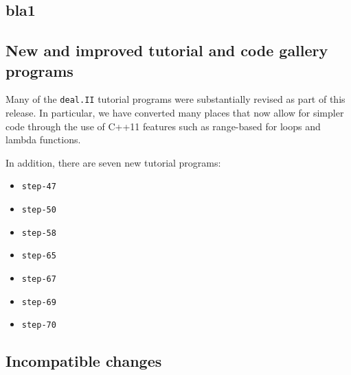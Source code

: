 \documentclass{ansarticle-preprint}
\newcommand{\specialword}[1]{\texttt{#1}}
\newcommand{\dealii}{{\specialword{deal.II}}\xspace}
\begin{document}
\subsection{bla1}
\label{subsec:bla1}



\subsection{New and improved tutorial and code gallery programs}
\label{subsec:steps}

Many of the \dealii{} tutorial programs were substantially revised as
part of this release. In particular, we have converted many places
that now allow for simpler code through the use of C++11 features such
as range-based for loops and lambda functions.

In addition, there are seven new tutorial programs:
\begin{itemize}
\item \texttt{step-47}
\item \texttt{step-50}
\item \texttt{step-58}
\item \texttt{step-65}
\item \texttt{step-67}
\item \texttt{step-69}
\item \texttt{step-70}
\end{itemize}


\subsection{Incompatible changes}
\end{document}

